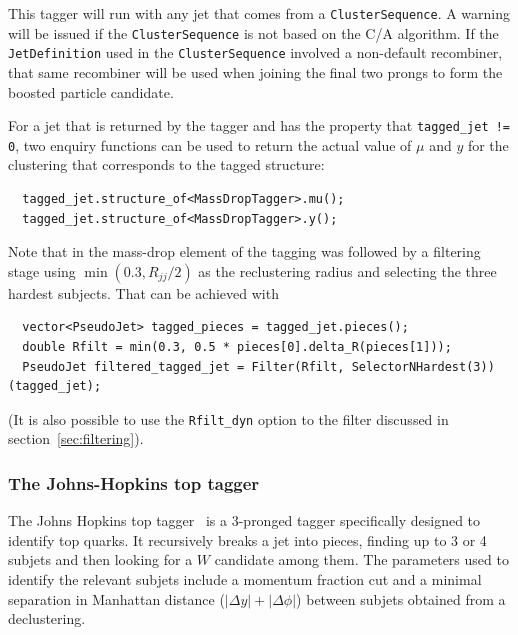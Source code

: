\documentclass[12pt,a4]{article}
\newcommand{\ttt}[1]{{\small\texttt{#1}}}
\newcommand{\CS}{\ttt{ClusterSequence}\xspace}
\begin{document}
%
This tagger will run with any jet that comes from a \CS. A warning
will be issued if the \CS is not based on the C/A algorithm.
%
If the \ttt{JetDefinition} used in the \CS involved a non-default
recombiner, that same recombiner will be used when joining the final
two prongs to form the boosted particle candidate.
%

For a jet that is returned by the tagger and has the property that
\ttt{tagged\_jet != 0}, two enquiry functions can be used to return
the actual value of $\mu$ and $y$ for the clustering that corresponds
to the tagged structure:
\begin{lstlisting}
  tagged_jet.structure_of<MassDropTagger>.mu();
  tagged_jet.structure_of<MassDropTagger>.y(); 
\end{lstlisting}

Note that in \cite{BDRS} the mass-drop element of the tagging was
followed by a filtering stage using $\min(0.3, R_{jj}/2)$ as the
reclustering radius and selecting the three hardest subjects. That can
be achieved with
\begin{lstlisting}
  vector<PseudoJet> tagged_pieces = tagged_jet.pieces();
  double Rfilt = min(0.3, 0.5 * pieces[0].delta_R(pieces[1]));
  PseudoJet filtered_tagged_jet = Filter(Rfilt, SelectorNHardest(3))(tagged_jet);
\end{lstlisting}
(It is also possible to use the \ttt{Rfilt\_dyn} option to the filter
discussed in section~\ref{sec:filtering}).


\subsubsection{The Johns-Hopkins top tagger}

The Johns Hopkins top tagger~\cite{Kaplan:2008ie} is a 3-pronged tagger
specifically designed to identify top quarks.
%
It recursively breaks a jet into pieces, finding up to 3 or 4 subjets
and then looking for a $W$ candidate among them.
%
The parameters used to identify the relevant subjets include a
momentum fraction cut and a minimal separation in Manhattan distance
($|\Delta y| + |\Delta \phi|$) between subjets obtained from a
declustering.
\end{document}
